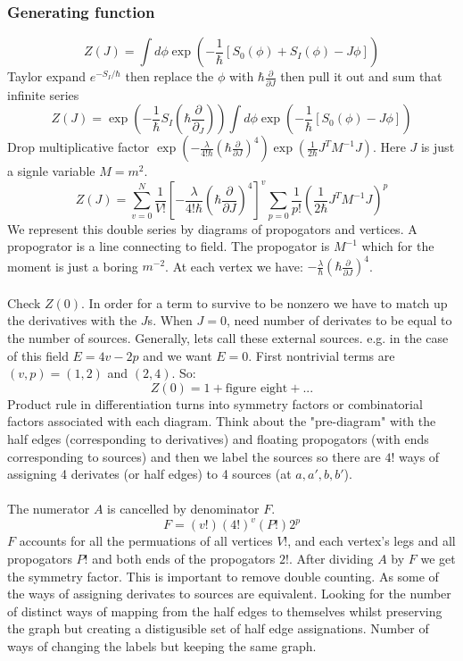 \documentclass{article}
\begin{document}
\subsubsection{Generating function}
$$
Z(J) = \int d\phi \exp( - \frac{1}{\hbar} [ S_0(\phi) + S_I(\phi) - J \phi] )
$$
Taylor expand $e^{-S_I/\hbar}$ then replace the $\phi$ with $\hbar \frac{\partial}{\partial J}$ then pull it out and sum that infinite series
$$
Z(J) = \exp( - \frac{1}{\hbar} S_I(\hbar \frac{\partial}{\partial_J}) )\int d\phi \exp ( - \frac{1}{\hbar} [S_0(\phi) - J \phi])
$$
Drop multiplicative factor $\exp( - \frac{\lambda}{4! \hbar}( \hbar \frac{\partial }{\partial J})^4) \exp ( \frac{1}{2\hbar} J^T M^{-1} J)$. Here $J$ is just a signle variable $M = m^2$.
\begin{equation}
Z(J) = \sum_{v= 0}^N \frac{1}{V!} [ - \frac{\lambda}{4!\hbar} (\hbar \frac{\partial}{\partial J})^4 ]^v \sum_{p=0} \frac{1}{p!} ( \frac{1}{2 \hbar} J^T M^{-1} J)^p
\end{equation}
We represent this double series by diagrams of propogators and vertices. A propogrator is a line connecting to field. The propogator is $M^{-1}$ which for the moment is just a boring $m^{-2}$. At each vertex we have: $- \frac{\lambda}{\hbar} ( \hbar \frac{\partial}{\partial J})^4$.\\\\
Check $Z(0)$. In order for a term to survive to be nonzero we have to match up the derivatives with the $J$s. When $J=0$, need number of derivates to be equal to the number of sources. Generally, lets call these external sources. e.g. in the case of this field $E = 4 v - 2p$ and we want $E=0$. First nontrivial terms are $(v,p) = (1,2)$ and $(2,4)$. So:
$$
Z(0) = 1 + \text{figure eight} + ...
$$
Product rule in differentiation turns into symmetry factors or combinatorial factors associated with each diagram. Think about the "pre-diagram" with the half edges (corresponding to derivatives) and floating propogators (with ends corresponding to sources) and then we label the sources so there are $4!$ ways of assigning 4 derivates (or half edges) to 4 sources (at $a, a', b, b'$). \\\\
The numerator $A$ is cancelled by denominator $F$. 
$$
F = (v!)(4!)^v (P!)2^p $$
$F$ accounts for all the permuations of all vertices $V!$, and each vertex's legs and all propogators $P!$ and both ends of the propogators $2!$. After dividing $A$ by $F$ we get the symmetry factor. This is important to remove double counting. As some of the ways of assigning derivates to sources are equivalent. Looking for the number of distinct ways of mapping from the half edges to themselves whilst preserving the graph but creating a distigusible set of half edge assignations. Number of ways of changing the labels but keeping the same graph.
\end{document}
